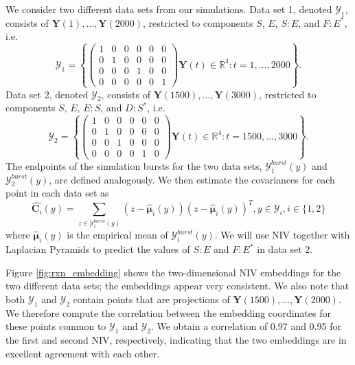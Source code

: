 \documentclass[aip,jcp,preprint]{revtex4-1}
\begin{document}
We consider two different data sets from our simulations.
%
Data set 1, denoted $\mathcal{Y}_1$, consists of $\mathbf{Y}(1), \dots, \mathbf{Y}(2000)$, restricted to components $S$, $E$, $S:E$, and $F:E^{*}$, i.e.
$$\mathcal{Y}_1 = \left\{
\left( \begin{array}{cccccc}
1 & 0 & 0 & 0 & 0 & 0 \\
0 & 1 & 0 & 0 & 0 & 0 \\
0 & 0 & 0 & 1 & 0 & 0 \\
0 & 0 & 0 & 0 & 0 & 1
\end{array} \right) \mathbf{Y}(t) \in \mathbb{R}^4: t=1, \dots, 2000 \right\}.$$
%
Data set 2, denoted $\mathcal{Y}_2$, consists of $\mathbf{Y}(1500), \dots, \mathbf{Y}(3000)$, restricted to components $S$, $E$, $E:S$, and $D:S^{*}$, i.e.
$$\mathcal{Y}_2 = \left\{
\left( \begin{array}{cccccc}
1 & 0 & 0 & 0 & 0 & 0 \\
0 & 1 & 0 & 0 & 0 & 0 \\
0 & 0 & 1 & 0 & 0 & 0 \\
0 & 0 & 0 & 0 & 1 & 0
\end{array} \right)
\mathbf{Y}(t) \in \mathbb{R}^4: t=1500, \dots, 3000 \right\}.$$
%
The endpoints of the simulation bursts for the two data sets, $\mathcal{Y}^{burst}_1(y)$ and $\mathcal{Y}^{burst}_2(y)$, are defined analogously.
%
We then estimate the covariances for each point in each data set as
\begin{equation}
\widehat{\mathbf{C}_i}(y) = \sum_{z \in \mathcal{Y}^{burst}_i(y)} \left( z - \hat{\mathbf{\mu}}_i(y) \right)\left( z - \hat{\mathbf{\mu}}_i(y) \right)^T, y \in \mathcal{Y}_i, i \in \{1, 2\}
\end{equation}
where $\hat{\mathbf{\mu}}_i(y)$ is the empirical mean of $\mathcal{Y}^{burst}_i(y)$.
%
We will use NIV together with Laplacian Pyramids to predict the values of $S:E$ and $F:E^{*}$ in data set 2.

Figure \ref{fig:rxn_embedding} shows the two-dimensional NIV embeddings for the two different data sets; the embeddings appear very consistent.
%
We also note that both $\mathcal{Y}_1$ and $\mathcal{Y}_2$ contain points that are projections of $\mathbf{Y}(1500), \dots, \mathbf{Y}(2000)$.
%
We therefore compute the correlation between the embedding coordinates for these points common to $\mathcal{Y}_1$ and $\mathcal{Y}_2$.
%
We obtain a correlation of 0.97 and 0.95 for the first and second NIV, respectively, indicating that the two embeddings are in excellent agreement with each other.
\end{document}

